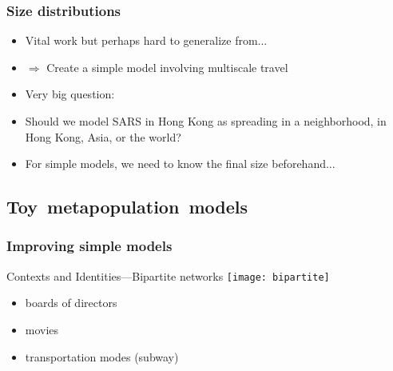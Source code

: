 \begin{frame}
  \frametitle{Size distributions}

  \begin{block}{}
    \begin{itemize}
    \item<1-> 
      Vital work but perhaps hard to generalize from...
    \item<2-> 
      $\Rightarrow$ Create a simple model involving multiscale travel
    \item<3-> Very big question: 
    \item<4-> Should we model SARS in Hong Kong as spreading 
      in a neighborhood, in Hong Kong, Asia, or the world?
    \item<5-> For simple models, we need to know the final size beforehand...
    \end{itemize}
  \end{block}
 
\end{frame}

\subsection{Toy\ metapopulation\ models}

 \begin{frame}
  \frametitle{Improving simple models}

  \begin{block}{Contexts and Identities---Bipartite networks}
    \medskip
    \centering
    \texttt{[image: bipartite]}
  \end{block}

  \begin{itemize}
  \item<2-> boards of directors
  \item<3-> movies
  \item<4-> transportation modes (subway)
  \end{itemize}
 
\end{frame}

